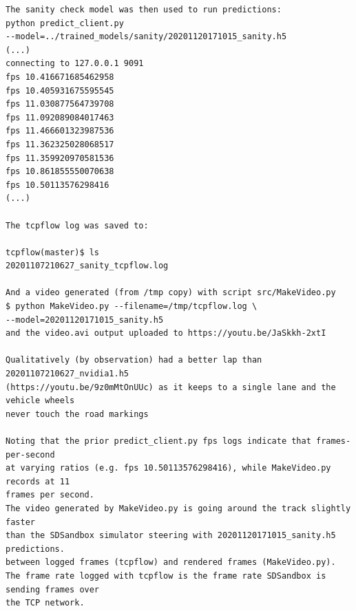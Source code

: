 \begin{verbatim}
The sanity check model was then used to run predictions:
python predict_client.py 
--model=../trained_models/sanity/20201120171015_sanity.h5
(...)
connecting to 127.0.0.1 9091
fps 10.416671685462958
fps 10.405931675595545
fps 11.030877564739708
fps 11.092089084017463
fps 11.466601323987536
fps 11.362325028068517
fps 11.359920970581536
fps 10.861855550070638
fps 10.50113576298416
(...)

The tcpflow log was saved to:

tcpflow(master)$ ls
20201107210627_sanity_tcpflow.log

And a video generated (from /tmp copy) with script src/MakeVideo.py
$ python MakeVideo.py --filename=/tmp/tcpflow.log \ 
--model=20201120171015_sanity.h5 
and the video.avi output uploaded to https://youtu.be/JaSkkh-2xtI

Qualitatively (by observation) had a better lap than 20201107210627_nvidia1.h5 
(https://youtu.be/9z0mMtOnUUc) as it keeps to a single lane and the vehicle wheels
never touch the road markings

Noting that the prior predict_client.py fps logs indicate that frames-per-second 
at varying ratios (e.g. fps 10.50113576298416), while MakeVideo.py records at 11
frames per second.
The video generated by MakeVideo.py is going around the track slightly faster
than the SDSandbox simulator steering with 20201120171015_sanity.h5 predictions.
between logged frames (tcpflow) and rendered frames (MakeVideo.py).
The frame rate logged with tcpflow is the frame rate SDSandbox is sending frames over 
the TCP network.

\end{verbatim}

